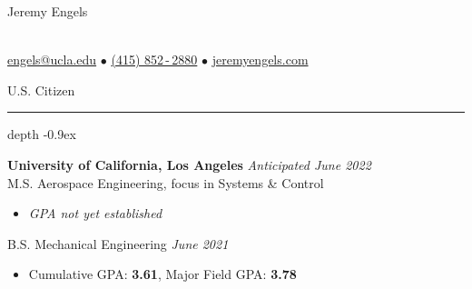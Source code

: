 \documentclass[11pt, letterpaper]{article}
\newcommand\smallspace{4pt}
\newcommand\indentlength{0.25in}
\def\Vhrulefill{\leavevmode\leaders\hrule height 1ex depth \dimexpr0.1pt-0.9ex\hfill\kern0pt}
\newenvironment{category}[1]
{
	\vspace{\smallspace}
	\noindent {\LARGE{\sc{#1}}} \hspace{2pt}
	\Vhrulefill
	\vspace{\smallspace}
	\begin{addmargin}[\indentlength]{0in}
}
{
	\end{addmargin}
	\vspace{\smallspace}
}
\begin{document}
\begin{center}
\begin{Huge}\begin{sc}Jeremy Engels\end{sc}\end{Huge} \\
\vspace{3pt}
\href{mailto:engels@g.ucla.edu}{{engels@ucla.edu}} \hspace{0.05in} $\bullet$ \hspace{0.05in} \href{tel:14158522880}{(415) 852\,-\,2880}  \hspace{0.05in} $\bullet$ \hspace{0.05in} \href{http://www.jeremyengels.com}{{jeremyengels.com}}

U.S. Citizen
\end{center}

\vspace{-3pt}
\begin{category}{Education}

\vspace{\smallspace}
\noindent\textbf{University of California, Los Angeles} \hfill \textit{Anticipated June 2022} \\
M.S. Aerospace Engineering, focus in Systems \& Control
\begin{itemize}
	\item \textit{GPA not yet established}
\end{itemize}
\vspace{\smallspace}
B.S. Mechanical Engineering \hfill \textit{June 2021}
	\begin{itemize}
		\item Cumulative GPA: \textbf{3.61}, Major Field GPA: \textbf{3.78}
		\end{itemize}
\end{category}
\end{document}
